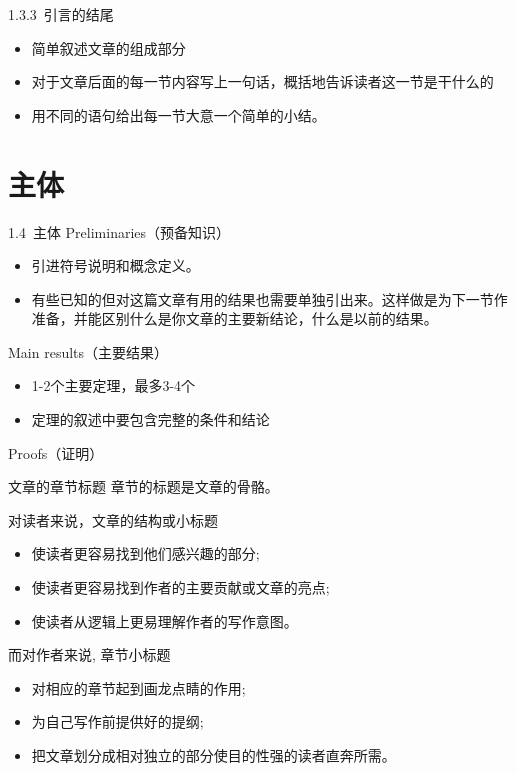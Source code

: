 \documentclass[13pt]{ctexbeamer}
\begin{document}
\begin{frame}{1.3.3~引言的结尾}
	\begin{itemize}
		
		\item 简单叙述文章的组成部分
		
		\item 对于文章后面的每一节内容写上一句话，概括地告诉读者这一节是干什么的
		\item 用不同的语句给出每一节大意一个简单的小结。
	\end{itemize}
\end{frame}

\section{主体}
\begin{frame}{1.4~主体}
	Preliminaries（预备知识）
	\begin{itemize}
		\item  引进符号说明和概念定义。
		\item  有些已知的但对这篇文章有用的结果也需要单独引出来。这样做是为下一节作准备，并能区别什么是你文章的主要新结论，什么是以前的结果。
	\end{itemize}
	Main results（主要结果）
		\begin{itemize}
		\item  1-2个主要定理，最多3-4个
		\item 定理的叙述中要包含完整的条件和结论
	\end{itemize}

Proofs（证明）
\end{frame}

\begin{frame}{文章的章节标题}
章节的标题是文章的骨骼。

对读者来说，文章的结构或小标题

\begin{itemize}
    \item  使读者更容易找到他们感兴趣的部分;
\item 使读者更容易找到作者的主要贡献或文章的亮点;
\item 使读者从逻辑上更易理解作者的写作意图。
\end{itemize}


而对作者来说, 章节小标题
\begin{itemize}
    \item  对相应的章节起到画龙点睛的作用;

\item 为自己写作前提供好的提纲;

\item 把文章划分成相对独立的部分使目的性强的读者直奔所需。
\end{itemize}
\end{frame}
\end{document}
